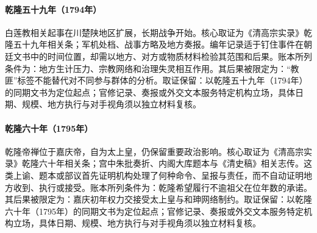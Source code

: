 \hypertarget{ledger:EQ-1794-WHITE-LOTUS-OUTBREAK}{}\paragraph{乾隆五十九年（1794年）}白莲教相关起事在川楚陕地区扩展，长期战争开始。核心取证为《清高宗实录》乾隆五十九年相关条；军机处档、战事方略及地方奏报。编年记录适于钉住事件在朝廷文书中的时间位置，却需以地方、对方或物质材料检验其范围和后果。账本所列条件为：地方生计压力、宗教网络和治理失灵相互作用。其后果被限定为：“教匪”标签不能替代对不同参与群体的分析。取证保留：以乾隆五十九年（1794年）的同期文书为定位起点；官修记录、奏报或外交文本服务特定机构立场，具体日期、规模、地方执行与对手视角须以独立材料复核。
\hypertarget{ledger:EQ-1795-QIANLONG-ABDICATION}{}\paragraph{乾隆六十年（1795年）}乾隆帝禅位于嘉庆帝，自为太上皇，仍保留重要政治影响。核心取证为《清高宗实录》乾隆六十年相关条；宫中朱批奏折、内阁大库题本与《清史稿》相关志传。这类上谕、题本或部议首先证明机构处理了何种命令、呈报与责任，而不自动证明地方收到、执行或接受。账本所列条件为：乾隆希望履行不逾祖父在位年数的承诺。其后果被限定为：嘉庆初年权力交接受太上皇与和珅网络制约。取证保留：以乾隆六十年（1795年）的同期文书为定位起点；官修记录、奏报或外交文本服务特定机构立场，具体日期、规模、地方执行与对手视角须以独立材料复核。

